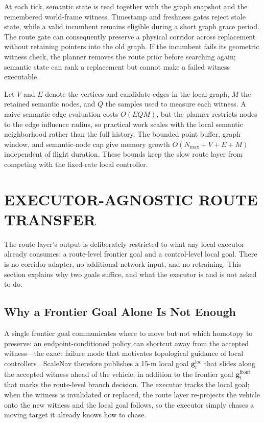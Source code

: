 \documentclass[letterpaper,10pt,conference]{ieeeconf}
\newcommand{\vect}[1]{\boldsymbol{#1}}
\begin{document}
At each tick, semantic state is read together with the graph snapshot and the
remembered world-frame witness.  Timestamp and freshness gates reject stale
state, while a valid incumbent remains eligible during a short graph grace
period.  The route gate can consequently preserve a physical corridor across
replacement without retaining pointers into the old graph.  If the incumbent
fails its geometric witness check, the planner removes the route prior before
searching again; semantic state can rank a replacement but cannot make a
failed witness executable.

Let $V$ and $E$ denote the vertices and candidate edges in the local graph,
$M$ the retained semantic nodes, and $Q$ the samples used to measure each
witness.  A naive semantic edge evaluation costs $O(EQM)$, but the planner
restricts nodes to the edge influence radius, so practical work scales with
the local semantic neighborhood rather than the full history.  The bounded
point buffer, graph window, and semantic-node cap give memory growth
$O(N_{\max}+V+E+M)$ independent of flight duration.  These bounds keep the
slow route layer from competing with the fixed-rate local controller.

\section{EXECUTOR-AGNOSTIC ROUTE TRANSFER}
\label{sec:execution}
The route layer's output is deliberately restricted to what any local
executor already consumes: a route-level frontier goal and a control-level
local goal.  There is no corridor adapter, no additional network input, and
no retraining.  This section explains why two goals suffice, and what the
executor is and is not asked to do.

\subsection{Why a Frontier Goal Alone Is Not Enough}
A single frontier goal communicates where to move but not which homotopy to
preserve: an endpoint-conditioned policy can shortcut away from the accepted
witness---the exact failure mode that motivates topological guidance of local
controllers \cite{ving,meng2020}.  ScaleNav therefore publishes a 15-m local
goal $\vect{g}^{\mathrm{loc}}_t$ that slides along the accepted witness ahead
of the vehicle, in addition to the frontier goal
$\vect{g}^{\mathrm{front}}_t$ that marks the route-level branch decision.
The executor tracks the local goal; when the witness is invalidated or
replaced, the route layer re-projects the vehicle onto the new witness and
the local goal follows, so the executor simply chases a moving target it
already knows how to chase.
\end{document}

